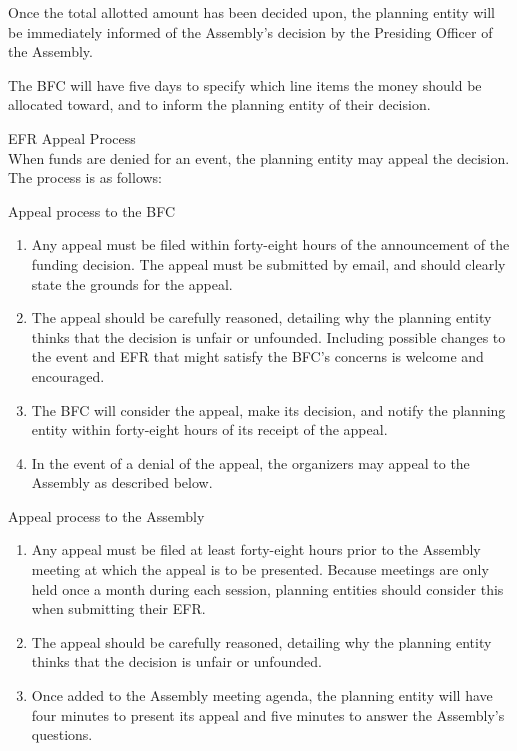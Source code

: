 \begin{bylaws-number}
\begin{bylaws-number}
  \item Once the total allotted amount has been decided upon, the planning entity will be immediately informed of the Assembly’s decision by the Presiding Officer of the Assembly.
  \item The BFC will have five days to specify which line items the money should be allocated toward, and to inform the planning entity of their decision.
\end{bylaws-number}
  \item EFR Appeal Process \hfill \\
When funds are denied for an event, the planning entity may appeal the decision. The process is as follows:
\begin{bylaws-number}
  \item Appeal process to the BFC
\begin{enumerate}[i]
  \item Any appeal must be filed within forty-eight hours of the announcement of the funding decision. The appeal must be submitted by email, and should clearly state the grounds for the appeal.
  \item The appeal should be carefully reasoned, detailing why the planning entity thinks that the decision is unfair or unfounded. Including possible changes to the event and EFR that might satisfy the BFC’s concerns is welcome and encouraged.
  \item The BFC will consider the appeal, make its decision, and notify the planning entity within forty-eight hours of its receipt of the appeal.
  \item In the event of a denial of the appeal, the organizers may appeal to the Assembly as described below.
\end{enumerate}
  \item Appeal process to the Assembly
\begin{enumerate}[i]
  \item Any appeal must be filed at least forty-eight hours prior to the Assembly meeting at which the appeal is to be presented. Because meetings are only held once a month during each session, planning entities should consider this when submitting their EFR.
  \item The appeal should be carefully reasoned, detailing why the planning entity thinks that the decision is unfair or unfounded.
  \item Once added to the Assembly meeting agenda, the planning entity will have four minutes to present its appeal and five minutes to answer the Assembly’s questions.

\end{enumerate}
\end{bylaws-number}
\end{bylaws-number}
